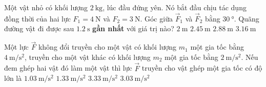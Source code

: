\begin{ex}
	Một vật nhỏ có khối lượng $\SI{2}{\kilogram}$, lúc đầu đứng yên. Nó bắt đầu chịu tác dụng đồng thời của hai lực $F_1=\SI{4}{\newton}$ và $F_2=\SI{3}{\newton}$. Góc giữa $\vec{F}_1$ và $\vec{F}_2$ bằng $\SI{30}{\degree}$. Quãng đường vật đi được sau $\SI{1.2}{\second}$ \textbf{gần nhất} với giá trị nào?
	\choice
	{$\SI{2}{\meter}$}
	{\True $\SI{2.45}{\meter}$}
	{$\SI{2.88}{\meter}$}
	{$\SI{3.16}{\meter}$}
	\loigiai{}
\end{ex}
\begin{ex}
	Một lực $\vec{F}$ không đổi truyền cho một vật có khối lượng $m_1$ một gia tốc bằng $\SI{4}{\meter/\second^2}$, truyền cho một vật khác có khối lượng $m_2$ một gia tốc bằng $\SI{2}{\meter/\second^2}$. Nếu đem ghép hai vật đó làm một vật thì lực $\vec{F}$ truyền cho vật ghép một gia tốc có độ lớn là
	\choice
	{$\SI{1.03}{\meter/\second^2}$}
	{\True $\SI{1.33}{\meter/\second^2}$}
	{$\SI{3.33}{\meter/\second^2}$}
	{$\SI{3.03}{\meter/\second^2}$}
	\loigiai{}
\end{ex}
